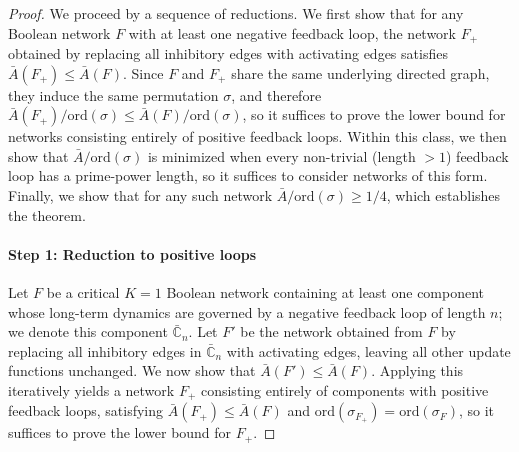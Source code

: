 \documentclass[11pt, reqno]{elsarticle}%
\theoremstyle{plain}
\begin{document}
 





\begin{proof}
    

We proceed by a sequence of reductions.
We first show that for any Boolean network $F$ with at least one 
negative feedback loop, the network $F_+$ obtained by replacing all 
inhibitory edges with activating edges satisfies $\bar{A}(F_+) \le 
\bar{A}(F)$. Since $F$ and $F_+$ share the same underlying directed 
graph, they induce the same permutation $\sigma$, and therefore
$\bar{A}(F_+)/\mathrm{ord}(\sigma) \le \bar{A}(F)/\mathrm{ord}(\sigma)$,
so it suffices to prove the lower bound for networks consisting 
entirely of positive feedback loops. Within this class, we then show that 
$\bar{A}/\mathrm{ord}(\sigma)$ is minimized when every 
non-trivial (length $>1$) feedback loop has a prime-power 
length, so it suffices to consider networks of this form. Finally, we show that for any such network 
$\bar{A}/\mathrm{ord}(\sigma) \ge 1/4$, which establishes the theorem.


\paragraph{Step 1: Reduction to positive loops}
Let $F$ be a critical $K=1$ Boolean network containing at least one 
component whose long-term dynamics are governed by a negative feedback 
loop of length $n$; we denote this component $\bar{\mathbb{C}}_n$. 
Let $F'$ be the network obtained from $F$ by replacing all inhibitory 
edges in $\bar{\mathbb{C}}_n$ with activating edges, leaving all 
other update functions unchanged. We now show that $\bar{A}(F') \le 
\bar{A}(F)$. Applying this iteratively yields a network $F_+$ consisting 
entirely of components with positive feedback loops, satisfying 
$\bar{A}(F_+) \le \bar{A}(F)$ and 
$\mathrm{ord}(\sigma_{F_+}) = \mathrm{ord}(\sigma_F)$, so it 
suffices to prove the lower bound for $F_+$.


\end{proof}
\end{document}
